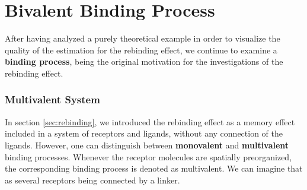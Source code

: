 \section{Bivalent Binding Process}


After having analyzed a purely theoretical example in order to visualize the quality of the estimation for the rebinding effect,
we continue to examine a \textbf{binding process}, being the original motivation for the investigations of the rebinding effect.

\subsubsection*{Multivalent System}

In section \ref{sec:rebinding}, we introduced the rebinding effect as a memory effect included in a system of receptors and ligands, without any connection of the ligands.
However, one can distinguish between \textbf{monovalent} and \textbf{multivalent} binding processes. %
Whenever the receptor molecules are spatially preorganized, the corresponding binding process is denoted as multivalent.
We can imagine that as several receptors being connected by a linker. %


